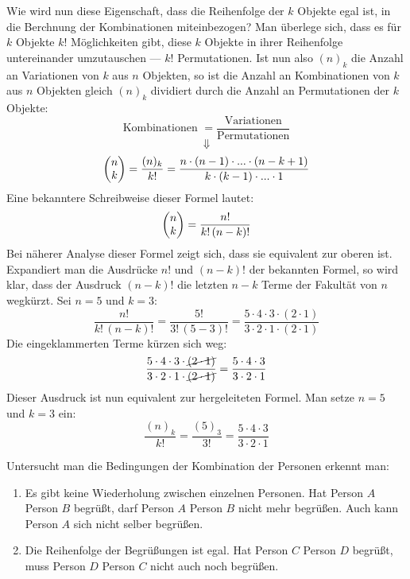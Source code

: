 Wie wird nun diese Eigenschaft, dass die Reihenfolge der $k$ Objekte egal ist, in die Berchnung der Kombinationen miteinbezogen? Man \"{u}berlege sich, dass es f\"{u}r $k$ Objekte $k!$ M\"{o}glichkeiten gibt, diese $k$ Objekte in ihrer Reihenfolge untereinander umzutauschen --- $k!$ Permutationen. Ist nun also $(n)_k$ die Anzahl an Variationen von $k$ aus $n$ Objekten, so ist die Anzahl an Kombinationen von $k$ aus $n$ Objekten gleich $(n)_k$ dividiert durch die Anzahl an Permutationen der $k$ Objekte: $$\text{Kombinationen } = \frac{\text{Variationen}}{\text{Permutationen}}$$ $$\Downarrow$$ $$ \begin{pmatrix}n \\ k\end{pmatrix} = \frac{(n)_k}{k!} = \frac{n \cdot (n - 1) \cdot ... \cdot (n - k + 1)}{k \cdot (k - 1) \cdot ... \cdot 1}$$ Eine bekanntere Schreibweise dieser Formel lautet: $$\begin{pmatrix}n \\ k\end{pmatrix} = \frac{n!}{k! \, (n - k)!}$$ Bei n\"{a}herer Analyse dieser Formel zeigt sich, dass sie equivalent zur oberen ist. Expandiert man die Ausdr\"{u}cke $n!$ und $(n - k)!$ der bekannten Formel, so wird klar, dass der Ausdruck $(n - k)!$ die letzten $n - k$ Terme der Fakult\"{a}t von $n$ wegk\"{u}rzt. Sei $n = 5$ und $k = 3$: $$\frac{n!}{k! \, (n - k)!} = \frac{5!}{3! \, (5 - 3)!} = \frac{5 \cdot 4 \cdot 3 \cdot (2 \cdot 1)}{3 \cdot 2 \cdot 1 \cdot (2 \cdot 1)}$$ Die eingeklammerten Terme k\"{u}rzen sich weg: $$\frac{5 \cdot 4 \cdot 3 \cdot \cancel{(2 \cdot 1)}}{3 \cdot 2 \cdot 1 \cdot \cancel{(2 \cdot 1)}} = \frac{5 \cdot 4 \cdot 3}{3 \cdot 2 \cdot 1}$$ Dieser Ausdruck ist nun equivalent zur hergeleiteten Formel. Man setze $n = 5$ und $k = 3$ ein: $$\frac{(n)_k}{k!} = \frac{(5)_3}{3!} = \frac{5 \cdot 4 \cdot 3}{3 \cdot 2 \cdot 1}$$


Untersucht man die Bedingungen der Kombination der Personen erkennt man: 

\begin{enumerate}
	\item Es gibt keine Wiederholung zwischen einzelnen Personen. Hat Person $A$ Person $B$ begr\"{u}\ss{}t, darf Person $A$ Person $B$ nicht mehr begr\"{u}\ss{}en. Auch kann Person $A$ sich nicht selber begr\"{u}\ss{}en.

	\item Die Reihenfolge der Begr\"{u}\ss{}ungen ist egal. Hat Person $C$ Person $D$ begr\"{u}\ss{}t, muss Person $D$ Person $C$ nicht auch noch begr\"{u}\ss{}en. 
\end{enumerate}

